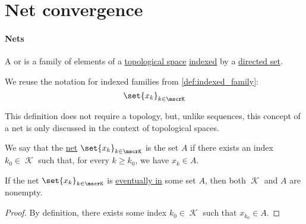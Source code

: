 \section{Net convergence}\label{sec:net_convergence}

\paragraph{Nets}

\begin{definition}\label{def:topological_net}
  A  or  is a family of elements of a \hyperref[def:topological_space]{topological space} \hyperref[def:indexed_family]{indexed} by a \hyperref[def:directed_set]{directed set}.

  We reuse the notation for indexed families from \cref{def:indexed_family}:
  \begin{equation*}
    \set{ x_k }_{k \in \mscrK}
  \end{equation*}
\end{definition}
\begin{comments}
  \item This definition does not require a topology, but, unlike sequences, this concept of a net is only discussed in the context of topological spaces.
\end{comments}

\begin{definition}\label{def:net_eventually_in}
  We say that the \hyperref[def:topological_net]{net} \( \set{ x_k }_{k \in \mscrK} \) is  the set \( A \) if there exists an index \( k_0 \in \mscrK \) such that, for every \( k \geq k_0 \), we have \( x_k \in A \).
\end{definition}

\begin{proposition}\label{thm:eventually_in_implies_nonempty}
  If the net \( \set{ x_k }_{k \in \mscrK} \) is \hyperref[def:net_eventually_in]{eventually in} some set \( A \), then both \( \mscrK \) and \( A \) are nonempty.
\end{proposition}
\begin{proof}
  By definition, there exists some index \( k_0 \in \mscrK \) such that \( x_{k_0} \in A \).
\end{proof}

